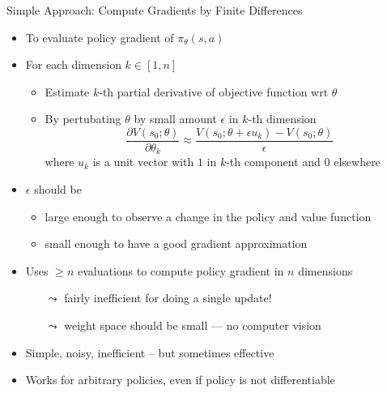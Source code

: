 \documentclass[aspectratio=169]{../latex_main/tntbeamer}  %
\begin{document}
\begin{frame}[c]{Simple Approach: Compute Gradients by Finite Differences}

        \vspace{-1em}
	\begin{itemize}
		\item To evaluate policy gradient of $\pi_\theta(s,a)$
		\item For each dimension $k\in [1,n]$
		\begin{itemize}
			\item Estimate $k$-th partial derivative of objective function wrt $\theta$
			\item By pertubating $\theta$ by small amount $\epsilon$ in $k$-th dimension
			$$\frac{\partial V(s_0; \theta)}{\partial \theta_k} \approx \frac{V(s_0; \theta + \epsilon u_k) - V(s_0; \theta)}{\epsilon} $$
			where $u_k$ is a unit vector with $1$ in $k$-th component and $0$ elsewhere
		\end{itemize}
		\pause
		\item $\epsilon$ should be
		\begin{itemize}
			\item large enough to observe a change in the policy and value function
			\item small enough to have a good gradient approximation
		\end{itemize}
		\pause
		\item Uses $\geq n$ evaluations to compute policy gradient in $n$ dimensions
		\begin{itemize}
			\item[$\leadsto$] fairly inefficient for doing a single update!
			\item[$\leadsto$] weight space should be small --- no computer vision
		\end{itemize}
		\pause
		\item Simple, noisy, inefficient -- but sometimes effective
		\item Works for arbitrary policies, even if policy is not differentiable
	\end{itemize}
	
\end{frame}
\end{document}
